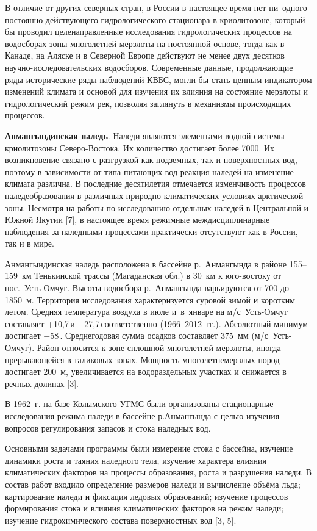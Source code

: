 В отличие от других северных стран, в России в настоящее время нет ни~одного постоянно действующего гидрологического стационара в криолитозоне, который бы проводил целенаправленные исследования гидрологических процессов на водосборах зоны многолетней мерзлоты на постоянной основе, тогда как в Канаде, на Аляске и в Северной Европе действуют не менее двух десятков научно-исследовательских водосборов. Современные данные, продолжающие ряды исторические ряды наблюдений КВБС, могли бы стать ценным индикатором изменений климата и основой для изучения их влияния на состояние мерзлоты и гидрологический режим рек, позволяя заглянуть в механизмы происходящих процессов.

\textbf{Анмангындинская наледь}. Наледи являются элементами водной системы криолитозоны Северо-Востока. Их количество достигает более 7000. Их возникновение связано с разгрузкой как подземных, так и поверхностных вод, поэтому в зависимости от типа питающих вод реакция наледей на изменение климата различна. В последние десятилетия отмечается изменчивость процессов наледеобразования в различных природно-климатических условиях арктической зоны. Несмотря на работы по исследованию отдельных наледей в Центральной и Южной Якутии [7], в настоящее время режимные междисциплинарные наблюдения за наледными процессами практически отсутствуют как в России, так и в мире.

Анмангындинская наледь расположена в бассейне р.~Анмангында в районе 155--159~км Тенькинской трассы (Магаданская обл.) в 30~км к юго-востоку от пос.~Усть-Омчуг. Высоты водосбора р.~Анмангында варьируются от 700 до 1850~м. Территория исследования характеризуется суровой зимой и коротким летом. Средняя температура воздуха в июле и~в~январе на м/с~Усть-Омчуг составляет +10,7\,\dgc  и $-$27,7\,\dgc соответственно (1966--2012~гг.). Абсолютный минимум достигает $-$58\,. Среднегодовая сумма осадков составляет 375~мм (м/с~Усть-Омчуг). Район относится к зоне сплошной многолетней мерзлоты, иногда прерывающейся в таликовых зонах. Мощность многолетнемерзлых пород достигает 200~м, увеличивается на водораздельных участках и снижается в речных долинах [3].

В 1962~г. на базе Колымского УГМС были организованы стационарные исследования режима наледи в бассейне р.Анмангында с целью изучения вопросов регулирования запасов и стока наледных вод.

Основными задачами программы были измерение стока с бассейна, изучение динамики роста и таяния наледного тела, изучение характера влияния климатических факторов на процессы образования, роста и разрушения наледи. В состав работ входило определение размеров наледи и вычисление объёма льда; картирование наледи и фиксация ледовых образований; изучение процессов формирования стока и влияния климатических факторов на режим наледи; изучение гидрохимического состава поверхностных вод [3, 5].

